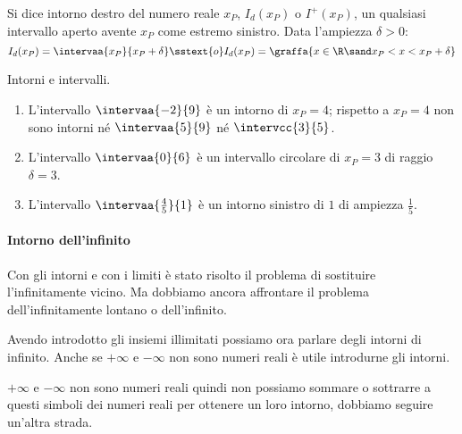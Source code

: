 \begin{newdef}{}{}
Si dice intorno destro del numero reale \(x_P\), \(I_d(x_P)\) o 
\(I^+(x_P)\), un qualsiasi intervallo aperto avente \(x_P\) come estremo 
sinistro. 
Data l'ampiezza \(\delta > 0\):
\[I_d(x_P) = \intervaa{x_P}{x_P+\delta} \sstext{o} 
  I_d(x_P) = \graffa{x \in \R \sand x_P < x < x_P+\delta}\]
\end{newdef}

\begin{center}  \end{center}



\begin{esempio} Intorni e intervalli.
\begin{enumerate}[label=\alph*)]
\item L'intervallo \(\intervaa{-2}{9}\) è un intorno di \(x_P=4\); rispetto 
a 
\(x_P=4\) non sono intorni né \(\intervaa{5}{9}\) né \(\intervcc{3}{5}\).
\item L'intervallo \(\intervaa{0}{6}\) è un intervallo circolare di 
\(x_P=3\) 
di raggio \(\delta=3\).
\item L'intervallo \(\intervaa{\frac{4}{5}}{1}\) è un intorno sinistro di 
\(1\) di ampiezza \(\frac{1}{5}\). 
\end{enumerate}
\end{esempio}

\paragraph{Intorno dell'infinito}

Con gli intorni e con i limiti è stato risolto il problema di sostituire 
l'infinitamente vicino.
Ma dobbiamo ancora affrontare il problema dell'infinitamente lontano o 
dell'infinito.

Avendo introdotto gli insiemi illimitati possiamo ora parlare degli intorni 
di infinito. Anche se 
\(+\infty\) e \(-\infty\) non sono numeri reali è utile 
introdurne gli intorni.

\(+\infty\) e \(-\infty\) non sono numeri reali quindi non possiamo sommare 
o sottrarre a questi simboli dei numeri reali per ottenere un loro intorno, 
dobbiamo seguire un'altra strada.

